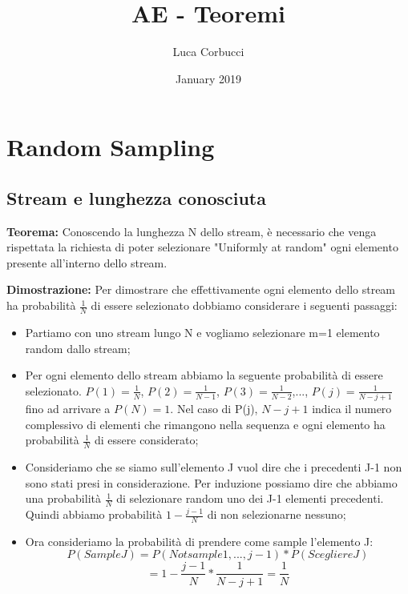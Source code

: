 \documentclass[12pt]{article}
\title{AE - Teoremi}
\author{Luca Corbucci}
\date{January 2019}
\begin{document}
\maketitle

\section{Random Sampling}

\subsection{Stream e lunghezza conosciuta}

\textbf{Teorema:} Conoscendo la lunghezza N dello stream, è necessario che venga rispettata la richiesta di poter selezionare "Uniformly at random" ogni elemento presente all'interno dello stream.

\textbf{Dimostrazione:} Per dimostrare che effettivamente ogni elemento dello stream ha probabilità $\frac{1}{N}$ di essere selezionato dobbiamo considerare i seguenti passaggi:
\begin{itemize}
    \item Partiamo con uno stream lungo N e vogliamo selezionare m=1 elemento random dallo stream;
    \item Per ogni elemento dello stream abbiamo la seguente probabilità di essere selezionato. $P(1) = \frac{1}{N}$,  $P(2) = \frac{1}{N-1}$,  $P(3) = \frac{1}{N-2}$,...,  $P(j) = \frac{1}{N-j+1}$ fino ad arrivare a  $P(N) = 1$. Nel caso di P(j), $N-j+1$ indica il numero complessivo di elementi che rimangono nella sequenza e ogni elemento ha probabilità $\frac{1}{N}$ di essere considerato;
    \item Consideriamo che se siamo sull'elemento J vuol dire che i precedenti J-1 non sono stati presi in considerazione. Per induzione possiamo dire che abbiamo una probabilità $\frac{1}{N}$ di selezionare random uno dei J-1 elementi precedenti. Quindi abbiamo probabilità $1-\frac{j-1}{N}$ di non selezionarne nessuno;
    \item Ora consideriamo la probabilità di prendere come sample l'elemento J: 
    \begin{equation}
        P(Sample J) = P(Not sample 1,...,j-1)*P(Scegliere J) 
    \end{equation}
    \begin{equation}
        = 1-\frac{j-1}{N} * \frac{1}{N-j+1} = \frac{1}{N}
    \end{equation}
\end{itemize}
\end{document}
